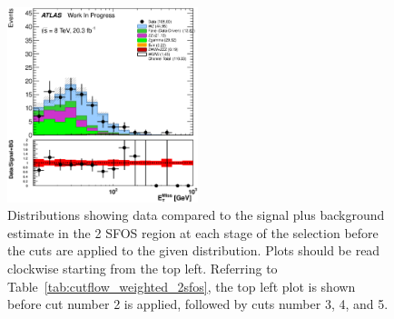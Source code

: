 \begin{figure}[ht!]
\includegraphics[width=0.495\textwidth]{figures/appendix_signal_selection/Nov24Update_FakeSys_KFacSys_LinearY_Rebin/output/jobs/MxM/DataFull_Rates_May13_FakeRatesExactly2Loose_MuonMxMBJetGt0_ElBJetGt0SubtractPC_MxM/PreselectionNov23_15_2SFOS_ChargeAbs1_BVeto85_ZVeto20GeV_physics/weight_all/eps/MET_Et_histratio.eps}



\caption{Distributions showing data compared to the signal plus background estimate in the 2 SFOS region at each stage 
of the selection before the cuts are applied to the given distribution. 
Plots should be read clockwise starting from the top left.
Referring to Table~\ref{tab:cutflow_weighted_2sfos}, the top left
plot is shown before cut number 2 is applied, followed by cuts
number 3, 4, and 5.}
\label{fig:2sfos_1}
\end{figure}


